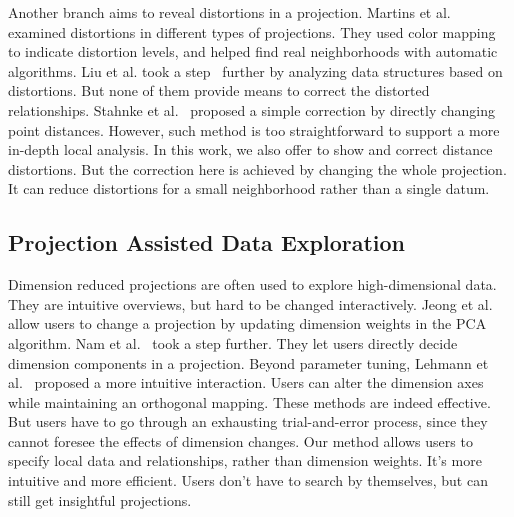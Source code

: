 Another branch aims to reveal distortions in a projection. Martins et al.~\cite{DBLP:journals/cg/MartinsCMT14} examined distortions in different types of projections. They used color mapping to indicate distortion levels, and helped find real neighborhoods with automatic algorithms. Liu et al. took a step~\cite{DBLP:journals/cgf/LiuWBP14} further by analyzing data structures based on distortions. But none of them provide means to correct the distorted relationships. Stahnke et al.~\cite{DBLP:journals/tvcg/StahnkeDMT16} proposed a simple correction by directly changing point distances. However, such method is too straightforward to support a more in-depth local analysis. In this work, we also offer to show and correct distance distortions. But the correction here is achieved by changing the whole projection. It can reduce distortions for a small neighborhood rather than a single datum.

\subsection{Projection Assisted Data Exploration}
Dimension reduced projections are often used to explore high-dimensional data. They are intuitive overviews, but hard to be changed interactively. Jeong et al.~\cite{DBLP:journals/cgf/JeongZFRC09} allow users to change a projection by updating dimension weights in the PCA algorithm. Nam et al.~\cite{DBLP:journals/tvcg/NamM13} took a step further. They let users directly decide dimension components in a projection. Beyond parameter tuning, Lehmann et al.~\cite{DBLP:journals/tvcg/LehmannT13} proposed a more intuitive interaction. Users can alter the dimension axes while maintaining an orthogonal mapping. These methods are indeed effective. But users have to go through an exhausting trial-and-error process, since they cannot foresee the effects of dimension changes. Our method allows users to specify local data and relationships, rather than dimension weights. It's more intuitive and more efficient. Users don't have to search by themselves, but can still get insightful projections.

